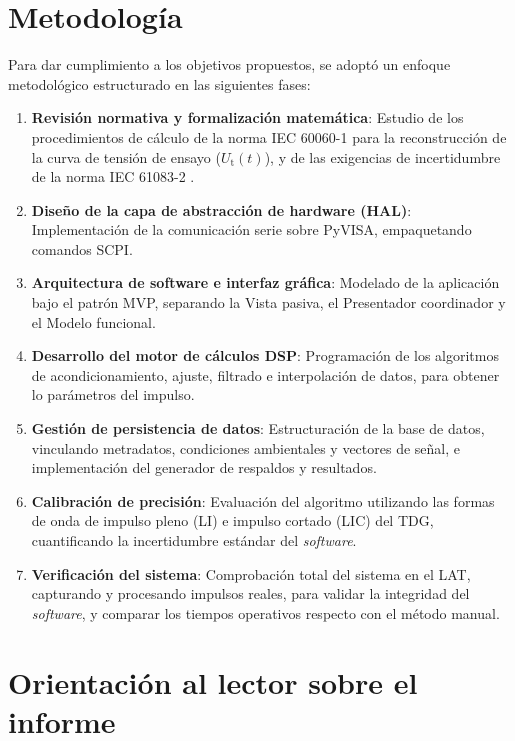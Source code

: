 \section{Metodología}
\label{sec:metodologia}

Para dar cumplimiento a los objetivos propuestos, se adoptó un enfoque metodológico estructurado en las siguientes fases:

\begin{enumerate}
    \item \textbf{Revisión normativa y formalización matemática}: Estudio de los procedimientos de cálculo de la norma IEC 60060-1 \cite{iec60060_1} para la reconstrucción de la curva de tensión de ensayo ($U_\text{t}(t)$), y de las exigencias de incertidumbre de la norma IEC 61083-2 \cite{iec61083_2}.
    \item \textbf{Diseño de la capa de abstracción de hardware (HAL)}: Implementación de la comunicación serie sobre PyVISA, empaquetando comandos SCPI.
    \item \textbf{Arquitectura de software e interfaz gráfica}: Modelado de la aplicación bajo el patrón MVP, separando la Vista pasiva, el Presentador coordinador y el Modelo funcional.
    \item \textbf{Desarrollo del motor de cálculos DSP}: Programación de los algoritmos de acondicionamiento, ajuste, filtrado e interpolación de datos, para obtener lo parámetros del impulso.
    \item \textbf{Gestión de persistencia de datos}: Estructuración de la base de datos, vinculando metradatos, condiciones ambientales y vectores de señal, e implementación del generador de respaldos y resultados.
    \item \textbf{Calibración de precisión}: Evaluación del algoritmo utilizando las formas de onda de impulso pleno (LI) e impulso cortado (LIC) del TDG, cuantificando la incertidumbre estándar del \emph{software}.
    \item \textbf{Verificación del sistema}: Comprobación total del sistema en el LAT, capturando y procesando impulsos reales, para validar la integridad del \emph{software}, y comparar los tiempos operativos respecto con el método manual.
\end{enumerate}

\section{Orientación al lector sobre el informe}
\label{sec:orientacion_lector}

